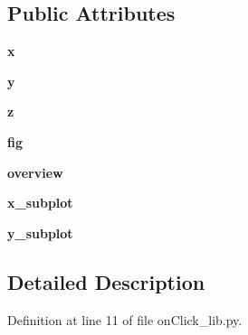 \subsection*{Public Attributes}
\begin{DoxyCompactItemize}
\item 
\hypertarget{classmain_1_1on_click__lib_1_1viewer__2d_ae9bc3d84f7c0813d72768ac348a578ca}{{\bfseries x}}\label{classmain_1_1on_click__lib_1_1viewer__2d_ae9bc3d84f7c0813d72768ac348a578ca}

\item 
\hypertarget{classmain_1_1on_click__lib_1_1viewer__2d_a333a73ad7cb17b3ad96ce9e49f8abd5d}{{\bfseries y}}\label{classmain_1_1on_click__lib_1_1viewer__2d_a333a73ad7cb17b3ad96ce9e49f8abd5d}

\item 
\hypertarget{classmain_1_1on_click__lib_1_1viewer__2d_a10cb0e439cbbdeda046805eed2792445}{{\bfseries z}}\label{classmain_1_1on_click__lib_1_1viewer__2d_a10cb0e439cbbdeda046805eed2792445}

\item 
\hypertarget{classmain_1_1on_click__lib_1_1viewer__2d_a97a19b2e22da954efba5b378be203a88}{{\bfseries fig}}\label{classmain_1_1on_click__lib_1_1viewer__2d_a97a19b2e22da954efba5b378be203a88}

\item 
\hypertarget{classmain_1_1on_click__lib_1_1viewer__2d_a1a6a884830fc2cbd83ada8f06e41496d}{{\bfseries overview}}\label{classmain_1_1on_click__lib_1_1viewer__2d_a1a6a884830fc2cbd83ada8f06e41496d}

\item 
\hypertarget{classmain_1_1on_click__lib_1_1viewer__2d_a20cbc49580d499d675c0c6c12edfe34a}{{\bfseries x\-\_\-subplot}}\label{classmain_1_1on_click__lib_1_1viewer__2d_a20cbc49580d499d675c0c6c12edfe34a}

\item 
\hypertarget{classmain_1_1on_click__lib_1_1viewer__2d_af9a15d4838f06f5897fd1fb651c1aa7b}{{\bfseries y\-\_\-subplot}}\label{classmain_1_1on_click__lib_1_1viewer__2d_af9a15d4838f06f5897fd1fb651c1aa7b}

\end{DoxyCompactItemize}


\subsection{Detailed Description}


Definition at line 11 of file on\-Click\-\_\-lib.\-py.



